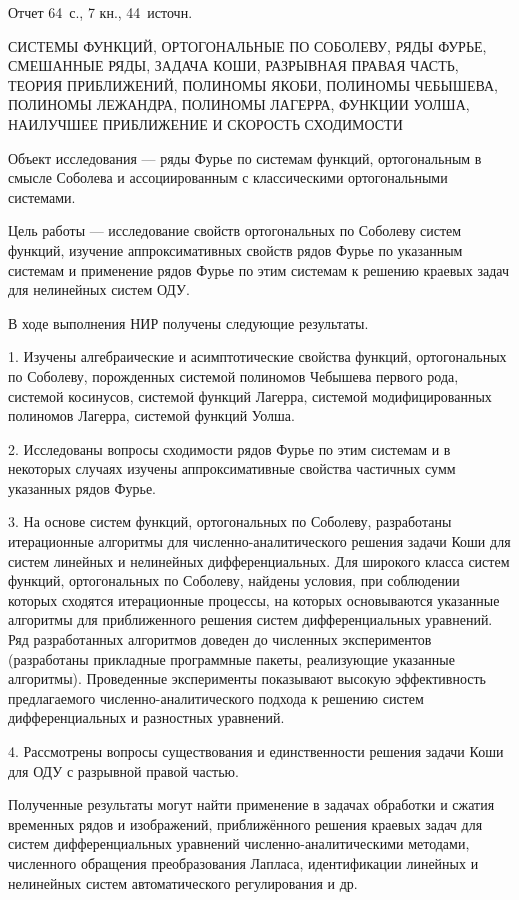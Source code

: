\Referat %


Отчет 64~с., 7 кн., 44~источн.

СИСТЕМЫ ФУНКЦИЙ, ОРТОГОНАЛЬНЫЕ ПО СОБОЛЕВУ, РЯДЫ ФУРЬЕ, СМЕШАННЫЕ РЯДЫ, ЗАДАЧА КОШИ, РАЗРЫВНАЯ ПРАВАЯ ЧАСТЬ,
  ТЕОРИЯ ПРИБЛИЖЕНИЙ, ПОЛИНОМЫ ЯКОБИ, ПОЛИНОМЫ ЧЕБЫШЕВА, ПОЛИНОМЫ ЛЕЖАНДРА, ПОЛИНОМЫ ЛАГЕРРА, ФУНКЦИИ УОЛША, НАИЛУЧШЕЕ ПРИБЛИЖЕНИЕ И СКОРОСТЬ СХОДИМОСТИ

Объект исследования --- ряды Фурье по системам функций, ортогональным в смысле Соболева и ассоциированным с классическими ортогональными системами.

Цель работы --- исследование свойств ортогональных по Соболеву систем функций, изучение аппроксимативных свойств рядов Фурье по указанным системам и применение рядов Фурье по этим системам к решению краевых задач для нелинейных систем ОДУ.

В ходе выполнения НИР получены следующие результаты.

1. Изучены алгебраические и асимптотические свойства функций, ортогональных по Соболеву, порожденных системой полиномов Чебышева первого рода, системой косинусов, системой функций Лагерра, системой модифицированных полиномов Лагерра, системой функций Уолша.

2. Исследованы вопросы сходимости рядов Фурье по этим системам и в некоторых случаях изучены аппроксимативные свойства частичных сумм указанных рядов Фурье.

3. На основе систем функций, ортогональных по Соболеву, разработаны итерационные алгоритмы для численно-аналитического решения задачи Коши для систем линейных и нелинейных дифференциальных. Для широкого класса систем функций, ортогональных по Соболеву, найдены условия, при соблюдении которых сходятся итерационные процессы, на которых основываются указанные алгоритмы для приближенного решения систем дифференциальных уравнений.
Ряд разработанных алгоритмов доведен до численных экспериментов (разработаны прикладные программные пакеты, реализующие указанные алгоритмы).
Проведенные эксперименты показывают высокую эффективность предлагаемого численно-аналитического подхода к решению систем дифференциальных и разностных уравнений.

4. Рассмотрены вопросы существования и единственности решения задачи Коши для ОДУ с разрывной правой частью.

Полученные результаты могут найти применение в задачах обработки и сжатия временных рядов и изображений, приближённого решения краевых задач для систем дифференциальных уравнений численно-аналитическими методами, численного обращения преобразования Лапласа, идентификации линейных и нелинейных систем автоматического регулирования и др.
